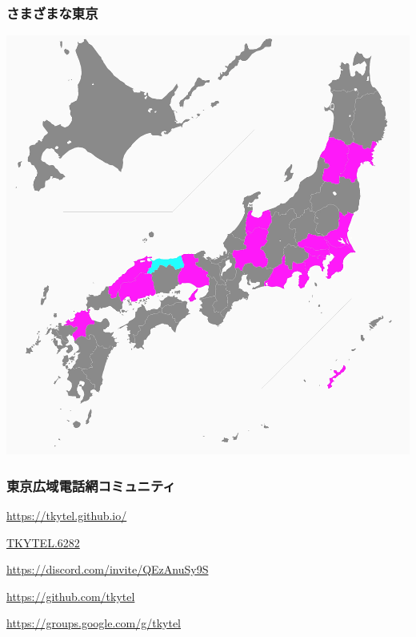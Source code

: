 \documentclass[
  lualatex,
  aspectratio=169,
  14pt
]{beamer}
\begin{document}
\begin{frame}
  \frametitle{さまざまな東京}

  \centering
  \includegraphics[height=\textheight]{./images/map.png}

\end{frame}


\begin{frame}
  \frametitle{東京広域電話網コミュニティ}

  \begin{description}[labelwidth=\linewidth]
    \item[Website]
      {\small
      \url{https://tkytel.github.io/}}
    \item[VRChat Group]
      {\small
      \href{https://vrc.group/TKYTEL.6282}{TKYTEL.6282}}
    \item[Discord]
      {\small
      \url{https://discord.com/invite/QEzAnuSy9S}}
    \item[GitHub Organization]
      {\small
      \url{https://github.com/tkytel}}
    \item[Mailing list]
      {\small
      \url{https://groups.google.com/g/tkytel}}
  \end{description}
\end{frame}
\end{document}
